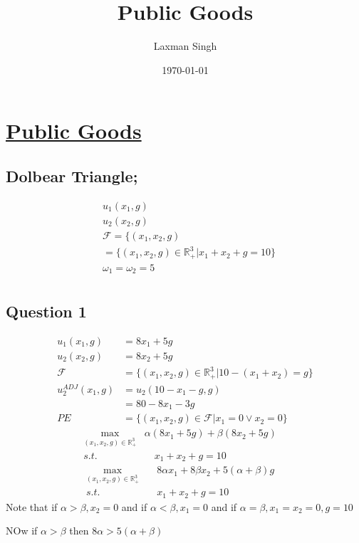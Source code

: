 \documentclass[12pt,a4paper]{article}
\author{Laxman Singh}
\date{\today}
\title{Public Goods}
\begin{document}
    \section*{\underline{Public Goods}}
\subsection*{Dolbear Triangle;}

      \begin{align*}
         &u_{1}(x_{1}, g)\\
         &u_{2}(x_{2},g)\\
         &\mathcal{F}=\{(x_{1},x_{2},g) \\
         &=\{(x_{1},x_{2},g)\in \mathbb{R}^3_{+} | x_{1}+x_{2}+g=10\} \\
         &\omega_{1}=\omega_{2}=5\\
     \end{align*}
\subsection*{Question 1}
      \begin{align*}
         u_{1}(x_{1},g)&=8x_{1}+5g\\
         u_{2}(x_{2},g)&=8x_{2}+5g\\
         \mathcal{F}&=\{(x_{1},x_{2},g)\in \mathbb{R}^3_{+} | 10-(x_{1}+x_{2})=g \} \\
         u_{2}^{ADJ}(x_{1},g) &= u_{2}(10-x_{1}-g,g)\\
         &= 80-8x_{1}-3g\\
         PE &= \{(x_{1},x_{2},g) \in \mathcal{F} | x_{1}=0 \vee x_{2}=0\}
     \end{align*}
      \begin{align*}
            \max_{(x_{1},x_{2},g)\in \mathbb{R}^{3}_{+}} & \alpha(8x_{1}+5g) + \beta(8x_{2}+5g) \quad   \\
            s.t. & \quad x_{1}+x_{2}+g=10
     \end{align*}
      \begin{align*}
            \max_{(x_{1},x_{2},g)\in \mathbb{R}^{3}_{+}} & \quad 8 \alpha x_{1} + 8 \beta x_{2} + 5(\alpha+\beta)g \quad  \\
            s.t. & \quad x_{1}+x_{2}+g=10 \quad 
     \end{align*}
      Note that if \(\alpha>\beta, x_{2}=0\) and if \(\alpha<\beta, x_{1}=0\) and if \(\alpha=\beta, x_{1}=x_{2}=0, g=10\) 
      
      NOw if \( \alpha > \beta \) then \(8\alpha > 5(\alpha+\beta)\)
\pagebreak 
\end{document}
